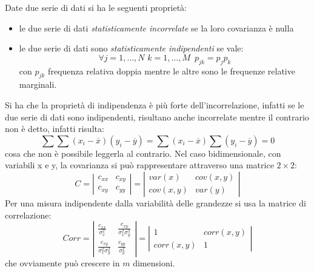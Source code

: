 \documentclass[a4paper,12pt, oneside]{book}
\begin{document}
Date due serie di dati si ha le seguenti proprietà:
\begin{itemize}
    \item le due serie di dati \emph{statisticamente incorrelate} se la loro covarianza è nulla
    \item le due serie di dati sono \emph{statisticamente indipendenti} se vale:
        \[ \forall j=1, \dots, N\,\,k=1, \dots, M\,\,\, p_{jk} = p_jp_k \]
             con $p_{jk}$ frequenza relativa doppia mentre le altre sono le frequenze relative marginali.
\end{itemize}
Si ha che la proprietà di indipendenza è più forte dell'incorrelazione, infatti se le due serie di dati sono 
indipendenti, risultano anche incorrelate mentre il contrario non è detto, infatti risulta:
\[ \sum \sum (x_i - \overline{x})(y_i - \overline{y}) = \sum (x_i - \overline{x}) \sum(y_i - \overline{y}) = 0 \]
cosa che non è possibile leggerla al contrario.\newline
Nel caso bidimensionale, con variabili x e y, la covarianza si può rappresentare attraverso una matrice $2 \times 2$:
\[ C = \left | \begin{matrix}
                c_{xx} & c_{xy}\\
                c_{xy} & c_	{yy}
                \end{matrix}\right| = \left|\begin{matrix}
                                            var(x) & cov(x,y)\\
                                            cov(x,y) & var(y)
                                            \end{matrix}\right| \]
Per una misura indipendente dalla variabilità delle grandezze si usa la matrice di correlazione:
\[ Corr=\left|\begin{matrix}
              \frac{c_{xx}}{\sigma_x^2} & \frac{c_{xy}}{\sigma_x^2\sigma_y^2} \\
              \frac{c_{xy}}{\sigma_x^2\sigma_y^2}   & \frac{c_{yy}}{\sigma_y^2} 
              \end{matrix}\right|=\left|\begin{matrix}
                                            1 & corr(x,y)\\
                                            corr(x,y) & 1
                                        \end{matrix}\right| \]
che ovviamente può crescere in $m$ dimensioni.
\end{document}
